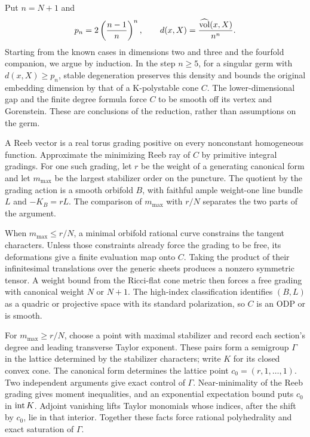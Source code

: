 Put \(n=N+1\) and
\[
 p_n=2\left(\frac{n-1}{n}\right)^n,\qquad
 d(x,X)=\frac{\widehat{\operatorname{vol}}(x,X)}{n^n}.
\]
Starting from the known cases in dimensions two and three and the
fourfold companion, we argue by induction. In the step \(n\ge5\), for a
singular germ with
\(d(x,X)\ge p_n\), stable degeneration preserves this density and
bounds the original embedding dimension by that of a K-polystable
cone \(C\). The lower-dimensional gap and the finite degree formula
force \(C\) to be smooth off its vertex and Gorenstein. These are
conclusions of the reduction, rather than assumptions on the germ.

A Reeb vector is a real torus grading positive on every nonconstant
homogeneous function. Approximate the minimizing Reeb ray of \(C\)
by primitive integral gradings. For one such grading, let \(r\) be
the weight of a generating canonical form and let \(m_{\max}\) be
the largest stabilizer order on the puncture. The quotient by the
grading action is a smooth orbifold \(B\), with faithful ample
weight-one line bundle \(L\) and \(-K_B=rL\).
The comparison of \(m_{\max}\) with \(r/N\) separates the two
parts of the argument.

When \(m_{\max}\le r/N\), a minimal orbifold rational curve
constrains the tangent characters. Unless those constraints already
force the grading to be free, its deformations give a finite evaluation
map onto \(C\). Taking the product of their infinitesimal translations
over the generic sheets produces a nonzero symmetric tensor. A weight
bound from the Ricci-flat cone metric then forces a free grading with
canonical weight \(N\) or \(N+1\). The high-index classification
identifies \((B,L)\) as a quadric or projective space with its standard
polarization, so \(C\) is an ODP or is smooth.

For \(m_{\max}\ge r/N\), choose a point with maximal stabilizer
and record each section's degree and leading transverse Taylor exponent.
These pairs form a semigroup \(\Gamma\) in the lattice determined
by the stabilizer characters; write \(K\) for its closed convex cone.
The canonical form determines the lattice point
\(c_0=(r,1,\ldots,1)\). Two independent arguments give exact control
of \(\Gamma\). Near-minimality of the Reeb grading gives moment
inequalities, and an exponential expectation bound puts \(c_0\) in
\(\operatorname{int} K\). Adjoint vanishing lifts Taylor monomials whose indices,
after the shift by \(c_0\), lie in that interior. Together these facts
force rational polyhedrality and exact saturation of \(\Gamma\).


